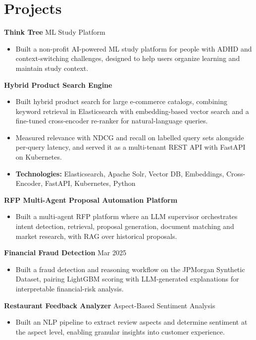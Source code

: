 \documentclass[10pt,a4paper]{article}
\begin{document}
\section{Projects}
\textbf{Think Tree} \textbar{} ML Study Platform\par
\begin{itemize}
  \item Built a non-profit AI-powered ML study platform for people with ADHD and context-switching challenges, designed to help users organize learning and maintain study context.
\end{itemize}
\textbf{Hybrid Product Search Engine}\par
\begin{itemize}
  \item Built hybrid product search for large e-commerce catalogs, combining keyword retrieval in Elasticsearch with embedding-based vector search and a fine-tuned cross-encoder re-ranker for natural-language queries.
  \item Measured relevance with NDCG and recall on labelled query sets alongside per-query latency, and served it as a multi-tenant REST API with FastAPI on Kubernetes.
  \item \textbf{Technologies:} Elasticsearch, Apache Solr, Vector DB, Embeddings, Cross-Encoder, FastAPI, Kubernetes, Python
\end{itemize}
\textbf{RFP Multi-Agent Proposal Automation Platform}\par
\begin{itemize}
  \item Built a multi-agent RFP platform where an LLM supervisor orchestrates intent detection, retrieval, proposal generation, document matching and market research, with RAG over historical proposals.
\end{itemize}
\textbf{Financial Fraud Detection} \textbar{} Mar 2025\par
\begin{itemize}
  \item Built a fraud detection and reasoning workflow on the JPMorgan Synthetic Dataset, pairing LightGBM scoring with LLM-generated explanations for interpretable financial-risk analysis.
\end{itemize}
\textbf{Restaurant Feedback Analyzer} \textbar{} Aspect-Based Sentiment Analysis\par
\begin{itemize}
  \item Built an NLP pipeline to extract review aspects and determine sentiment at the aspect level, enabling granular insights into customer experience.
\end{itemize}
\end{document}
